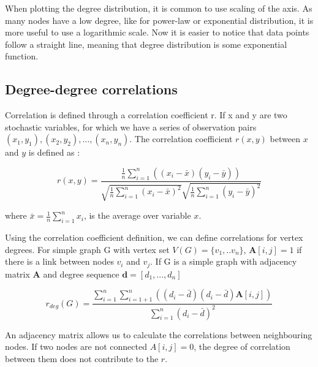 When plotting the degree distribution, it is common to use scaling of the axis. As many nodes have a low degree, like for power-law or exponential distribution, it is more useful to use a logarithmic scale. Now it is easier to notice that data points follow a straight line, meaning that degree distribution is some exponential function. 

\subsection{Degree-degree correlations} %

Correlation is defined through a correlation coefficient r. If x and y are two stochastic variables, for which we have a series of observation pairs $(x_1, y_1), (x_2, y_2), ...,(x_n, y_n)$. The correlation coefficient $r(x, y)$ between $x$ and $y$ is defined as \cite{van2010graph}:

\begin{equation}
r(x, y) = \frac{\frac{1}{n}\sum_{i=1}^{n}((x_i - \bar{x} ) (y_i - \bar{y}) )}{\sqrt{\frac{1}{n}\sum_{i=1}^{n}(x_i - \bar{x})^2} \sqrt{\frac{1}{n}\sum_{i=1}^{n}(y_i - \bar{y})^2} }
\end{equation}

where $\bar{x} = \frac{1}{n}\sum_{i=1}^{n}x_i$, is the average over variable $x$.

Using the correlation coefficient definition, we can define correlations for vertex degrees. For simple graph G with vertex set $V(G) = \{v_1, ..v_n\}$, $\boldsymbol{A}[i,j] = 1$ if there is a link between nodes $v_i$ and $v_j$. If G is a simple graph with adjacency matrix $\boldsymbol{A}$ and degree sequence $\boldsymbol{d} = [d_1, ..., d_n]$

\begin{equation}
r_{deg}(G) = \frac{\sum_{i=1}^{n}\sum_{i=1+1}^{n}((d_i - \bar{d}) (d_i - \bar{d}) \boldsymbol{A}[i,j] )}{\sum_{i=1}^{n}(d_i - \bar{d})^2}
\end{equation}

An adjacency matrix allows us to calculate the correlations between neighbouring nodes. If two nodes are not connected $A[i,j]=0$, the degree of correlation between them does not contribute to the $r$.

